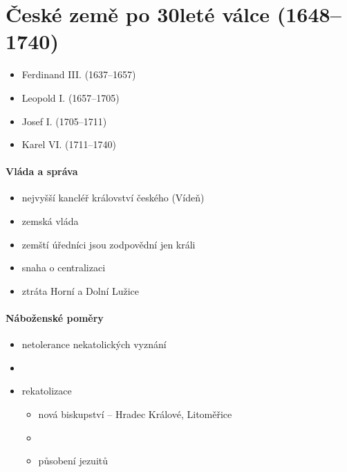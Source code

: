 \section{České země po 30leté válce (1648--1740)}
\begin{itemize}
\item Ferdinand III. (1637--1657)
\item Leopold I. (1657--1705)
\item Josef I. (1705--1711)
\item Karel VI. (1711--1740)
\end{itemize}

\paragraph{Vláda a správa}
\begin{itemize}
\item nejvyšší kancléř království českého (Vídeň)
\item zemská vláda
\item zemští úředníci jsou zodpovědní jen králi
\item snaha o centralizaci
\item ztráta Horní a Dolní Lužice
\end{itemize}

\paragraph{Náboženské poměry}
\begin{itemize}
\item netolerance nekatolických vyznání
\item {}
\item rekatolizace
	\begin{itemize}
	\item nová biskupství -- Hradec Králové, Litoměřice
	\item {}
	\item působení jezuitů
	\end{itemize}
\end{itemize}

